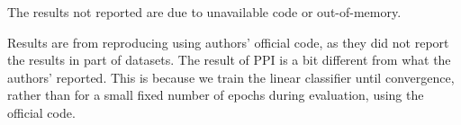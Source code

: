 \begin{table}[htbp]
\begin{threeparttable}
\begin{tabular}{c|c|cccccc}
        \bottomrule[1.2pt]
    \end{tabular}
     \begin{tablenotes}
        \footnotesize
        \item[] The results not reported are due to unavailable code or out-of-memory.
        \item[1] Results are from reproducing using authors' official code, as they did not report the results in part of datasets. The result of PPI is a bit different from what the authors' reported. This is because we train the linear classifier until convergence, rather than for a small fixed number of epochs during evaluation, using the official code.
    \end{tablenotes}

    \end{threeparttable}
    \label{tab:node_clf}
\end{table}

